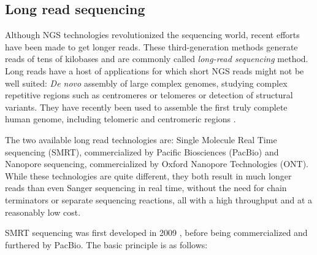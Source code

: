 \documentclass[
  11pt,
  twoside,
  BCOR=10mm,
  listof=totoc]{scrbook}
\begin{document}
\hypertarget{long-read-sequencing}{%
\subsection{Long read sequencing}\label{long-read-sequencing}}

Although NGS technologies revolutionized the sequencing world, recent efforts have been made to get longer reads. These third-generation methods generate reads of tens of kilobases and are commonly called \emph{long-read sequencing} method. Long reads have a host of applications \autocite{pollardLongReadsTheir2018} for which short NGS reads might not be well suited: \emph{De novo} assembly of large complex genomes, studying complex repetitive regions such as centromeres or telomeres or detection of structural variants. They have recently been used to assemble the first truly complete human genome, including telomeric and centromeric regions \autocite{nurk2022}.

The two available long read technologies are: Single Molecule Real Time sequencing (SMRT), commercialized by Pacific Biosciences (PacBio) and Nanopore sequencing, commercialized by Oxford Nanopore Technologies (ONT). While these technologies are quite different, they both result in much longer reads than even Sanger sequencing in real time, without the need for chain terminators or separate sequencing reactions, all with a high throughput and at a reasonably low cost.

SMRT sequencing was first developed in 2009 \autocite{eidRealTimeDNASequencing2009}, before being commercialized and furthered by PacBio. The basic principle is as follows:
\end{document}
